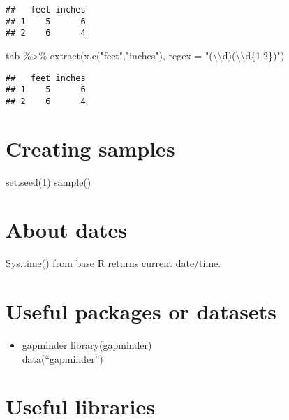 \documentclass[
]{book}
\newenvironment{Shaded}{\begin{snugshade}}{\end{snugshade}}
\newcommand{\AttributeTok}[1]{\textcolor[rgb]{0.77,0.63,0.00}{#1}}
\newcommand{\FunctionTok}[1]{\textcolor[rgb]{0.00,0.00,0.00}{#1}}
\newcommand{\NormalTok}[1]{#1}
\newcommand{\SpecialCharTok}[1]{\textcolor[rgb]{0.00,0.00,0.00}{#1}}
\newcommand{\StringTok}[1]{\textcolor[rgb]{0.31,0.60,0.02}{#1}}
\providecommand{\tightlist}{%
  \setlength{\itemsep}{0pt}\setlength{\parskip}{0pt}}
\begin{document}
\begin{verbatim}
##   feet inches
## 1    5      6
## 2    6      4
\end{verbatim}

\begin{Shaded}
\begin{Highlighting}[]
\NormalTok{tab }\SpecialCharTok{\%\textgreater{}\%} \FunctionTok{extract}\NormalTok{(x,}\FunctionTok{c}\NormalTok{(}\StringTok{"feet"}\NormalTok{,}\StringTok{"inches"}\NormalTok{), }\AttributeTok{regex =} \StringTok{"(}\SpecialCharTok{\textbackslash{}\textbackslash{}}\StringTok{d)\textquotesingle{}(}\SpecialCharTok{\textbackslash{}\textbackslash{}}\StringTok{d\{1,2\})"}\NormalTok{)}
\end{Highlighting}
\end{Shaded}

\begin{verbatim}
##   feet inches
## 1    5      6
## 2    6      4
\end{verbatim}

\hypertarget{creating-samples}{%
\section{Creating samples}\label{creating-samples}}

set.seed(1)
sample()

\hypertarget{about-dates}{%
\section{About dates}\label{about-dates}}

Sys.time() from base R returns current date/time.

\hypertarget{useful-packages-or-datasets}{%
\section{Useful packages or datasets}\label{useful-packages-or-datasets}}

\begin{itemize}
\tightlist
\item
  gapminder
  library(gapminder)\\
  data(``gapminder'')
\end{itemize}

\hypertarget{useful-libraries}{%
\section{Useful libraries}\label{useful-libraries}}
\end{document}
